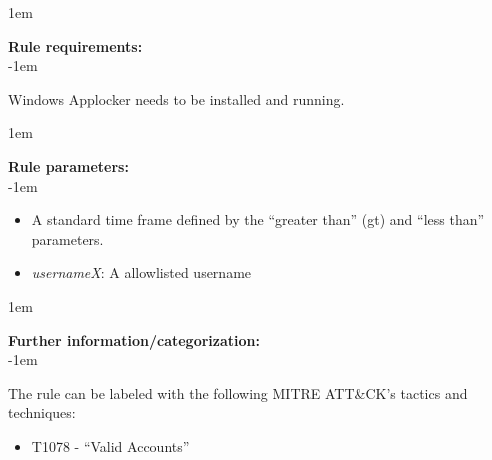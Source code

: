 \openup 1em

{\bf Rule requirements:} \\

\openup -1em
\vspace{-2em}

Windows Applocker needs to be installed and running.

\openup 1em

{\bf Rule parameters:} \\

\openup -1em
\vspace{-2em}

\begin{itemize}
	\item A standard time frame defined by the ``greater than'' (gt) and ``less than'' parameters.
	\item \emph{usernameX}: A allowlisted username
\end{itemize}

\openup 1em

{\bf Further information/categorization:} \\

\openup -1em
\vspace{-2em}


The rule can be labeled with the following MITRE ATT\&CK's tactics and techniques:
\begin{itemize}
	\item T1078 - ``Valid Accounts''
\end{itemize}

\pagebreak

